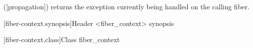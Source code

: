  ([propagation]) returns the exception currently being handled on the
calling fiber.



[fiber-context.synopsis]{Header <fiber\_context> synopsis}


[fiber-context.class]{Class fiber\_context}


\newcommand{\state}{\cpp{state}}

\label{constructor}

